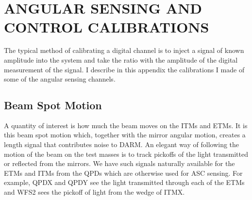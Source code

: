 \chapter{ANGULAR SENSING AND CONTROL CALIBRATIONS}
\label{ch:ASCcal}
The typical method of calibrating a digital channel is to inject a
signal of known amplitude into the system and take the ratio with the
amplitude of the digital measurement of the signal.
I describe in this appendix the calibrations I made of some of the
angular sensing channels.



\section{Beam Spot Motion}
\label{sec:bsmcal}
A quantity of interest is how much the beam moves on the ITMs and
ETMs. It is this beam spot motion which, together with the mirror
angular motion, creates a length signal that contributes noise to
DARM. An elegant way of following the motion of the beam on the test
masses is to track pickoffs of the light transmitted or reflected from
the mirrors. We have such signals naturally available for the ETMs and
ITMs from the QPDs which are otherwise used for ASC sensing. For
example, QPDX and QPDY see the light transmitted through each of the
ETMs and WFS2 sees the pickoff of light from the wedge of ITMX.

